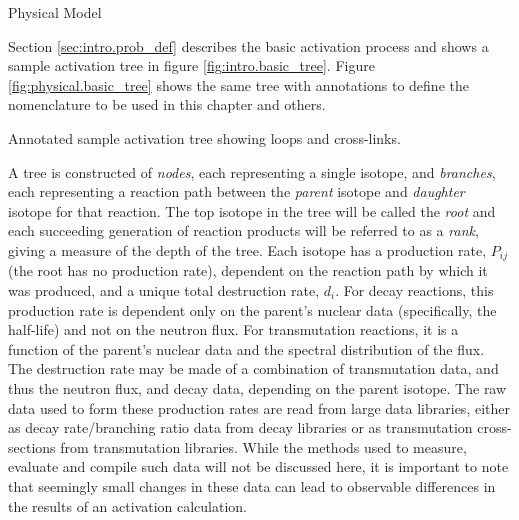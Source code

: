 \begin{chapter}{Physical Model\label{chap:physical}}

Section \ref{sec:intro.prob_def} describes the basic activation
process and shows a sample activation tree in figure
\ref{fig:intro.basic_tree}.  Figure \ref{fig:physical.basic_tree}
shows the same tree with annotations to define the nomenclature to be
used in this chapter and others.

\begin{floatingfigure}{0.55\columnwidth}
  \begin{center}
    \caption{Annotated sample activation tree showing loops and
      cross-links.}\label{fig:physical.basic_tree}
  \end{center}
\end{floatingfigure}

A tree is constructed of \textsl{nodes}, each representing a single
isotope, and \textsl{branches}, each representing a reaction path
between the \textsl{parent} isotope and \textsl{daughter} isotope for
that reaction.  The top isotope in the tree will be called the
\textsl{root} and each succeeding generation of reaction products will
be referred to as a \textsl{rank}, giving a measure of the depth of
the tree.  Each isotope has a production rate, $P_{ij}$ (the root has
no production rate), dependent on the reaction path by which it was
produced, and a unique total destruction rate, $d_i$.  For decay
reactions, this production rate is dependent only on the parent's
nuclear data (specifically, the half-life) and not on the neutron
flux.  For transmutation reactions, it is a function of the parent's
nuclear data and the spectral distribution of the flux.  The
destruction rate may be made of a combination of transmutation data,
and thus the neutron flux, and decay data, depending on the parent
isotope.  The raw data used to form these production rates are read
from large data libraries, either as decay rate/branching ratio data
from decay libraries or as transmutation cross-sections from
transmutation libraries.  While the methods used to measure, evaluate
and compile such data\cite{EAF,FENDL2} will not be discussed here, it
is important to note that seemingly small changes in these data can
lead to observable differences in the results of an activation
calculation.


\end{chapter}
